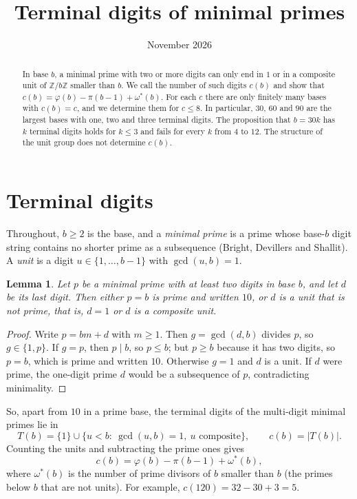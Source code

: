 \documentclass[11pt]{article}
\title{Terminal digits of minimal primes}
\author{}  %
\date{November 2026}
\newtheorem{lemma}[theorem]{Lemma}
\theoremstyle{remark}
\newcommand{\Z}{\mathbb{Z}}
\begin{document}
\maketitle

\begin{abstract}
In base $b$, a minimal prime with two or more digits can only end in $1$ or in a composite unit of $\Z/b\Z$ smaller than $b$. We call the number of such digits $c(b)$ and show that $c(b)=\varphi(b)-\pi(b-1)+\omega^*(b)$. For each $c$ there are only finitely many bases with $c(b)=c$, and we determine them for $c\le 8$. In particular, $30$, $60$ and $90$ are the largest bases with one, two and three terminal digits. The proposition that $b=30k$ has $k$ terminal digits holds for $k\le 3$ and fails for every $k$ from $4$ to $12$. The structure of the unit group does not determine $c(b)$.
\end{abstract}

\section{Terminal digits}

Throughout, $b\ge 2$ is the base, and a \emph{minimal prime} is a prime whose base-$b$ digit string contains no shorter prime as a subsequence (Bright, Devillers and Shallit). A \emph{unit} is a digit $u\in\{1,\dots,b-1\}$ with $\gcd(u,b)=1$.

\begin{lemma}\label{lem:terminal}
Let $p$ be a minimal prime with at least two digits in base $b$, and let $d$ be its last digit. Then either $p=b$ is prime and written $10$, or $d$ is a unit that is not prime, that is, $d=1$ or $d$ is a composite unit.
\end{lemma}

\begin{proof}
Write $p=bm+d$ with $m\ge 1$. Then $g=\gcd(d,b)$ divides $p$, so $g\in\{1,p\}$. If $g=p$, then $p\mid b$, so $p\le b$; but $p\ge b$ because it has two digits, so $p=b$, which is prime and written $10$. Otherwise $g=1$ and $d$ is a unit. If $d$ were prime, the one-digit prime $d$ would be a subsequence of $p$, contradicting minimality.
\end{proof}

So, apart from $10$ in a prime base, the terminal digits of the multi-digit minimal primes lie in
\[
T(b)=\{1\}\cup\{u<b:\ \gcd(u,b)=1,\ u \text{ composite}\},\qquad c(b)=|T(b)|.
\]
Counting the units and subtracting the prime ones gives
\[
c(b)=\varphi(b)-\pi(b-1)+\omega^*(b),
\]
where $\omega^*(b)$ is the number of prime divisors of $b$ smaller than $b$ (the primes below $b$ that are not units). For example, $c(120)=32-30+3=5$.
\end{document}
